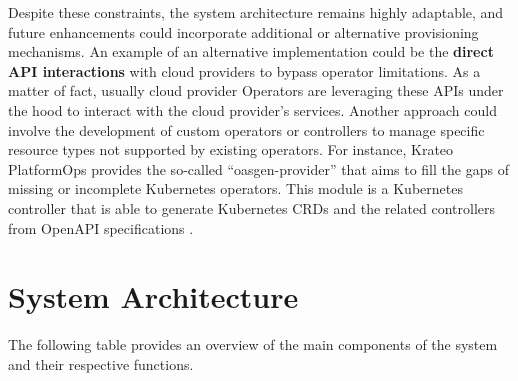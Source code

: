 Despite these constraints, the system architecture remains highly adaptable, and future enhancements could incorporate additional or alternative provisioning mechanisms. 
An example of an alternative implementation could be the \textbf{direct API interactions} with cloud providers to bypass operator limitations. As a matter of fact, usually cloud provider Operators are leveraging these APIs under the hood to interact with the cloud provider’s services.
Another approach could involve the development of custom operators or controllers to manage specific resource types not supported by existing operators.
For instance, Krateo PlatformOps provides the so-called ``oasgen-provider'' that aims to fill the gaps of missing or incomplete Kubernetes operators. This module is a Kubernetes controller that is able to generate Kubernetes CRDs and the related controllers from OpenAPI specifications \cite{krateo_oasgen_provider}. 

\newpage

\section{System Architecture}
\label{sec:system_architecture}

The following table provides an overview of the main components of the system and their respective functions.

